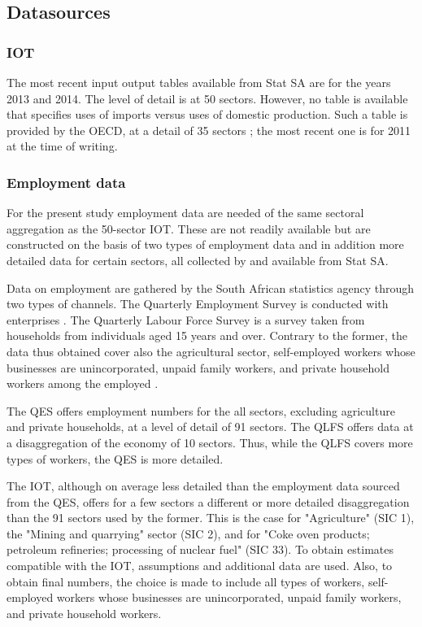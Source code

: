 \documentclass[12pt,english]{article}
\begin{document}
\subsection{Datasources}

\subsubsection{IOT}	

The most recent input output tables available from Stat SA are for the years 2013 and 2014. The level of detail is at 50 sectors. However, no table is available that specifies uses of imports versus uses of domestic production. Such a table is provided by the OECD, at a detail of 35 sectors ; the most recent one is for 2011 at the time of writing.

\subsubsection{Employment data}
For the present study employment data are needed of the same sectoral aggregation as the 50-sector IOT. These are not readily available but are constructed on the basis of two types of employment data and in addition more detailed data for certain sectors, all collected by and available from Stat SA.
 
Data on employment are gathered by the South African statistics agency through two types of channels. The Quarterly Employment Survey is conducted with enterprises \citep{QES2018}. The Quarterly Labour Force Survey is a survey taken from households from individuals aged 15 years and over. Contrary to the former, the data thus obtained cover also the agricultural sector, self-employed workers whose businesses are unincorporated, unpaid family workers, and private household workers among the employed \citep{QLFS2018}.

The QES offers employment numbers for the all sectors, excluding agriculture and private households, at a level of detail of 91 sectors. The QLFS offers data at a disaggregation of the economy of 10 sectors. Thus, while the QLFS covers more types of workers, the QES is more detailed.

The IOT, although on average less detailed than the employment data sourced from the QES, offers for a few sectors a different or more detailed disaggregation than the 91 sectors used by the former. This is the case for "Agriculture" (SIC 1), the "Mining and quarrying" sector (SIC 2), and for "Coke oven products; petroleum refineries; processing of nuclear fuel" (SIC 33). To obtain estimates compatible with the IOT, assumptions and additional data are used. Also, to obtain final numbers, the choice is made to include all types of workers, self-employed workers whose businesses are unincorporated, unpaid family workers, and private household workers. %
 
\end{document}
